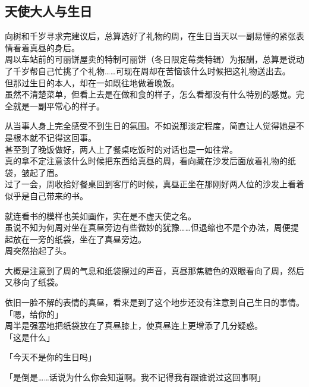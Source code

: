 \subsection{天使大人与生日}

向树和千岁寻求完建议后，总算选好了礼物的周，在生日当天以一副易懂的紧张表情看着真昼的身后。\\

周以车站前的可丽饼屋卖的特制可丽饼（冬日限定莓类特辑）为报酬，总算是说动了千岁帮自己忙挑了个礼物……可现在周却在苦恼该什么时候把这礼物送出去。\\

但那过生日的本人，却在一如既往地做着晚饭。\\

虽然不清楚菜单，但看上去是在做和食的样子，怎么看都没有什么特别的感觉。完全就是一副平常心的样子。

从当事人身上完全感受不到生日的氛围。不如说那淡定程度，简直让人觉得她是不是根本就不记得这回事。\\

甚至到了晚饭做好，两人上了餐桌吃饭时的对话也是一如往常。\\

真的拿不定注意该什么时候把东西给真昼的周，看向藏在沙发后面放着礼物的纸袋，皱起了眉。\\

过了一会，周收拾好餐桌回到客厅的时候，真昼正坐在那刚好两人位的沙发上看着似乎是自己带来的书。

就连看书的模样也美如画作，实在是不虚天使之名。\\

虽说不知为何周对坐在真昼旁边有些微妙的犹豫……但退缩也不是个办法，周便提起放在一旁的纸袋，坐在了真昼旁边。\\

周突然抬起了头。

大概是注意到了周的气息和纸袋擦过的声音，真昼那焦糖色的双眼看向了周，然后又移向了纸袋。

依旧一脸不解的表情的真昼，看来是到了这个地步还没有注意到自己生日的事情。\\

「嗯，给你的」\\

周半是强塞地把纸袋放在了真昼膝上，使真昼连上更增添了几分疑惑。\\

「这是什么」

「今天不是你的生日吗」

「是倒是……话说为什么你会知道啊。我不记得我有跟谁说过这回事啊」\\

